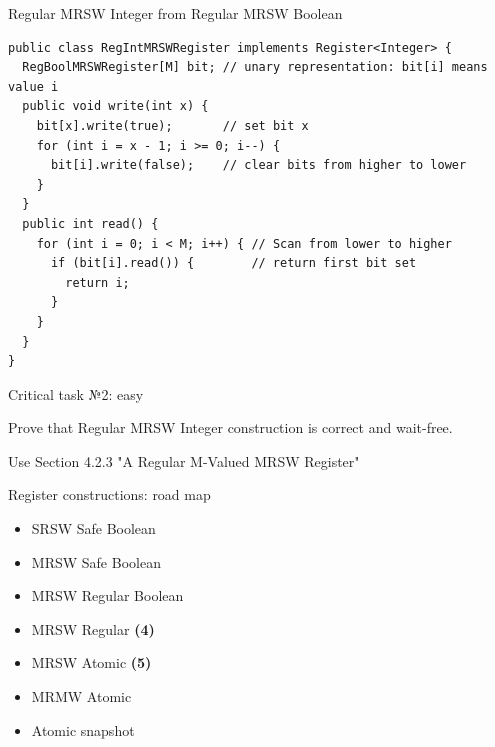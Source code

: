 \begin{frame}[fragile]{Regular MRSW Integer from Regular MRSW Boolean}

\begin{verbatim}
public class RegIntMRSWRegister implements Register<Integer> {
  RegBoolMRSWRegister[M] bit; // unary representation: bit[i] means value i
  public void write(int x) {
    bit[x].write(true);       // set bit x
    for (int i = x - 1; i >= 0; i--) {
      bit[i].write(false);    // clear bits from higher to lower
    }
  }
  public int read() {
    for (int i = 0; i < M; i++) { // Scan from lower to higher
      if (bit[i].read()) {        // return first bit set
        return i;
      }
    }
  }
}
\end{verbatim}

\end{frame}


\begin{frame}{Critical task №2: easy}

\begin{homeworkcritical}
  Prove that Regular MRSW Integer construction is correct and wait-free.

  Use Section 4.2.3 "A Regular M-Valued MRSW Register"
\end{homeworkcritical}

\end{frame}


\begin{frame}{Register constructions: road map}

\begin{itemize}
  \item SRSW Safe Boolean 
  \item MRSW Safe Boolean 
  \item MRSW Regular Boolean 
  \item MRSW Regular \textbf{(4)}
  \item MRSW Atomic \textbf{(5)}
  \item MRMW Atomic
  \item Atomic snapshot
\end{itemize}

\end{frame}


